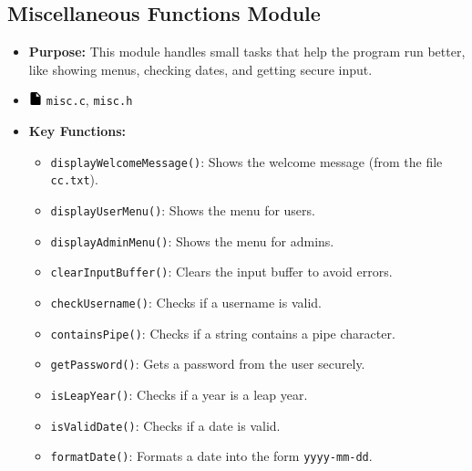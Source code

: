 \documentclass[12pt,a4paper]{report}
\begin{document}
\subsection{Miscellaneous Functions Module}
\begin{itemize}
    \item \normalsize \textbf{Purpose:} This module handles small tasks that help the program run better, like showing menus, checking dates, and getting secure input.
    \item \normalsize \includegraphics[width=0.03\textwidth]{../resources/assets/images/file_icon.png} \texttt{misc.c}, \texttt{misc.h}
    \item \normalsize \textbf{Key Functions:}
    \begin{itemize}
        \item \texttt{displayWelcomeMessage()}: Shows the welcome message (from the file \texttt{cc.txt}).
        \item \texttt{displayUserMenu()}: Shows the menu for users.
        \item \texttt{displayAdminMenu()}: Shows the menu for admins.
        \item \texttt{clearInputBuffer()}: Clears the input buffer to avoid errors.
        \item \texttt{checkUsername()}: Checks if a username is valid.
        \item \texttt{containsPipe()}: Checks if a string contains a pipe character.
        \item \texttt{getPassword()}: Gets a password from the user securely.
        \item \texttt{isLeapYear()}: Checks if a year is a leap year.
        \item \texttt{isValidDate()}: Checks if a date is valid.
        \item \texttt{formatDate()}: Formats a date into the form \texttt{yyyy-mm-dd}.
    \end{itemize}
\end{itemize}
\end{document}
